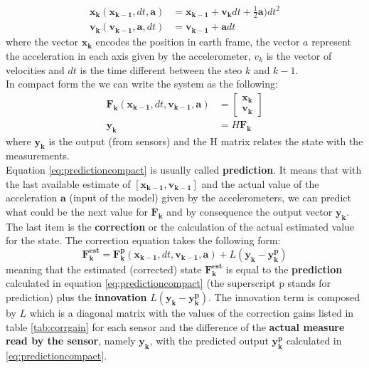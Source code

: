 \begin{equation}
	\begin{aligned}
	\boldsymbol{x_k}(\boldsymbol{x_{k-1}}, dt , \boldsymbol{a})& = \boldsymbol{x_{k-1}} + \boldsymbol{v_k}dt + \frac{1}{2}\boldsymbol{a}) dt^2 \\
	 \boldsymbol{v_k} ( \boldsymbol{v_{k-1}} ,\boldsymbol{a} , dt)& = \boldsymbol{v_{k-1}} + \boldsymbol{a}dt
	\end{aligned}
	\label{eq:prediction}
\end{equation}
where the vector $\boldsymbol{x_k}$ encodes the position in earth frame, the vector $a$ represent the acceleration in each axis given by the accelerometer, $v_k$ is the vector of velocities and $dt$ is the time different between the steo $k$ and $k-1$.\\

\noindent
In compact form the we can write the system as the following:
\begin{equation}
	\begin{aligned}
	\boldsymbol{F_k}(\boldsymbol{x_{k-1}}, dt ,\boldsymbol{v_{k-1}}, \boldsymbol{a})& = \begin{bmatrix}\boldsymbol{x_k}\\\boldsymbol{v_k}\end{bmatrix}\\
	\boldsymbol{y_k}& = H \boldsymbol{F_k}
	\end{aligned}
	\label{eq:predictioncompact}
	\end{equation}
where $\boldsymbol{y_k}$ is the output  (from sensors) and the H matrix relates the state with the measurements. \\

\noindent
Equation \eqref{eq:predictioncompact} is usually called \textbf{prediction}. It means that with the last available estimate of  $[\boldsymbol{x_{k-1}},\boldsymbol{v_{k-1}}]$ and the actual value of the acceleration $\boldsymbol{a}$ (input of the model) given by the accelerometers, we can predict what could be the next value for $\boldsymbol{F_k}$ and by consequence the output vector $\boldsymbol{y_k}$. \\

\noindent
The last item is the \textbf{correction} or the calculation of the actual estimated value for the state. The correction equation takes the following form:
\begin{equation}
	\boldsymbol{F_k^{est}} = \boldsymbol{F_k^p}(\boldsymbol{x_{k-1}}, dt ,\boldsymbol{v_{k-1}}, \boldsymbol{a}) + L(\boldsymbol{y_k} - \boldsymbol{y_k^p})
	\label{eq:observer}
\end{equation}
meaning that the estimated (corrected) state $\boldsymbol{F_k^{est}}$ is equal to the \textbf{prediction} calculated in equation \eqref{eq:predictioncompact} (the superscript p stands for prediction) plus the \textbf{innovation} $L(\boldsymbol{y_k} - \boldsymbol{y_k^p})$. The innovation term is composed by $L$ which is a diagonal matrix with the values of the correction gains listed in table \ref{tab:corrgain} for each sensor and the difference of the \textbf{actual measure read by the sensor}, namely $\boldsymbol{y_k}$, with the predicted output $\boldsymbol{y_k^p}$ calculated in \eqref{eq:predictioncompact}. \\

